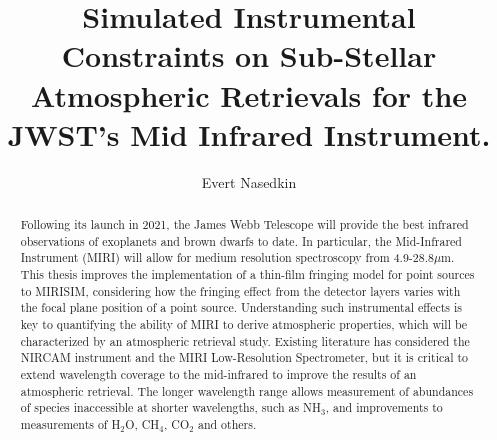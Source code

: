 \documentclass[]{article}
\title{Simulated Instrumental Constraints on Sub-Stellar Atmospheric Retrievals for the JWST's Mid Infrared Instrument.}
\author{Evert Nasedkin}
\begin{document}
\graphicspath{{figures/}}
\maketitle
\begin{abstract}
Following its launch in 2021, the James Webb Telescope will provide the best infrared observations of exoplanets and brown dwarfs to date.
In particular, the Mid-Infrared Instrument (MIRI) will allow for medium resolution spectroscopy from 4.9-28.8$\mu$m.
This thesis improves the implementation of a thin-film fringing model for point sources to MIRISIM, considering how the fringing effect from the detector layers varies with the focal plane position of a point source. 
Understanding such instrumental effects is key to quantifying the ability of MIRI to derive atmospheric properties, which will be characterized by an atmospheric retrieval study.
Existing literature has considered the NIRCAM instrument and the MIRI Low-Resolution Spectrometer, but it is critical to extend wavelength coverage to the mid-infrared to improve the results of an atmospheric retrieval. 
The longer wavelength range allows measurement of abundances of species inaccessible at shorter wavelengths, such as NH$_{3}$, and improvements to measurements of H$_{2}$O, CH$_{4}$, CO$_{2}$ and others.
\end{abstract}
\vspace{0em}
\end{document}
